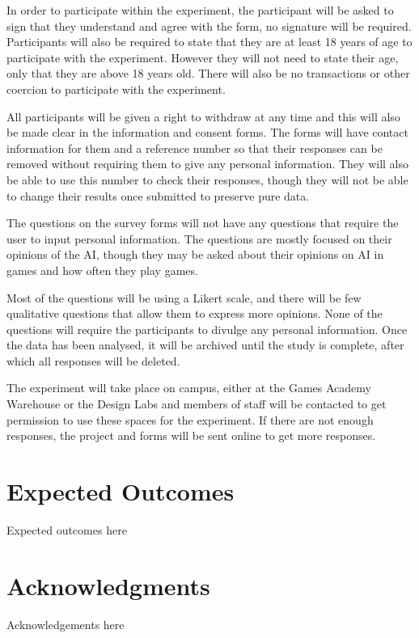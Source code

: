 \documentclass{IEEEtran}
\begin{document}
In order to participate within the experiment, the participant will be asked to sign that they understand and agree with the form, no signature will be required. Participants will also be required to state that they are at least 18 years of age to participate with the experiment. However they will not need to state their age, only that they are above 18 years old. There will also be no transactions or other coercion to participate with the experiment.

All participants will be given a right to withdraw at any time and this will also be made clear in the information and consent forms. The forms will have contact information for them and a reference number so that their responses can be removed without requiring them to give any personal information. They will also be able to use this number to check their responses, though they will not be able to change their results once submitted to preserve pure data.

The questions on the survey forms will not have any questions that require the user to input personal information. The questions are mostly focused on their opinions of the AI, though they may be asked about their opinions on AI in games and how often they play games.

Most of the questions will be using a Likert scale, and there will be few qualitative questions that allow them to express more opinions. None of the questions will require the participants to divulge any personal information. Once the data has been analysed, it will be archived until the study is complete, after which all responses will be deleted.

The experiment will take place on campus, either at the Games Academy Warehouse or the Design Labs and members of staff will be contacted to get permission to use these spaces for the experiment. If there are not enough responses, the project and forms will be sent online to get more responses.


\section{Expected Outcomes}
\label{ExpectedOutcomes}

Expected outcomes here
 
\section*{Acknowledgments}

Acknowledgements here


 
\end{document}
